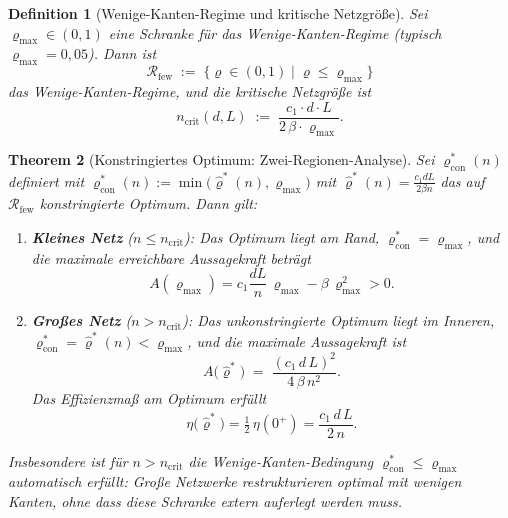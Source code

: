 \documentclass[12pt, a4paper, openany]{report}
\newtheorem{theorem}{Theorem}[chapter]
\newtheorem{definition}[theorem]{Definition}
\newcommand{\calR}{\mathcal{R}}
\begin{document}
\begin{definition}[Wenige-Kanten-Regime und kritische Netzgröße]
\label{def:few_edges}
Sei $\varrho_{\max} \in (0, 1)$ eine Schranke für das
Wenige-Kanten-Regime (typisch $\varrho_{\max} = 0{,}05$).  Dann ist
\[
  \calR_{\mathrm{few}} \;:=\; \bigl\{\varrho \in (0,1)
  \;\big|\; \varrho \leq \varrho_{\max}\bigr\}
\]
das \emph{Wenige-Kanten-Regime}, und die \emph{kritische Netzgröße} ist
\begin{equation}
  \label{eq:n_crit}
  n_{\mathrm{crit}}(d, L)
  \;:=\;
  \frac{c_1 \cdot d \cdot L}{2\,\beta \cdot \varrho_{\max}}.
\end{equation}
\end{definition}

\begin{theorem}[Konstringiertes Optimum: Zwei-Regionen-Analyse]
\label{thm:scaling}
Sei $\varrho^*_{\mathrm{con}}(n)$ definiert mit $\varrho^*_{\mathrm{con}}(n) := \min\!\bigl(\hat{\varrho}^*(n),
\varrho_{\max}\bigr)$ mit $\hat{\varrho}^*(n) = \frac{c_1 d L}{2\beta n}$
das auf $\calR_{\mathrm{few}}$ konstringierte Optimum.  Dann gilt:
\begin{enumerate}[label=(\roman*)]
  \item \textbf{Kleines Netz} ($n \leq n_{\mathrm{crit}}$):
    Das Optimum liegt am Rand, $\varrho^*_{\mathrm{con}} = \varrho_{\max}$,
    und die maximale erreichbare Aussagekraft beträgt
    \[
      A(\varrho_{\max})
      = c_1 \frac{d L}{n}\,\varrho_{\max} - \beta\,\varrho_{\max}^2
      > 0.
    \]
  \item \textbf{Großes Netz} ($n > n_{\mathrm{crit}}$):
    Das unkonstringierte Optimum liegt im Inneren,
    $\varrho^*_{\mathrm{con}} = \hat{\varrho}^*(n) < \varrho_{\max}$,
    und die maximale Aussagekraft ist
    \begin{equation}
      \label{eq:A_opt}
      A\!\bigl(\hat{\varrho}^*\bigr)
      \;=\; \frac{(c_1\,d\,L)^2}{4\,\beta\,n^2}.
    \end{equation}
    Das Effizienzmaß am Optimum erfüllt
    \begin{equation}
      \label{eq:eta_half}
      \eta\!\bigl(\hat{\varrho}^*\bigr) = \tfrac{1}{2}\,\eta(0^+)
      = \frac{c_1\,d\,L}{2\,n}.
    \end{equation}
\end{enumerate}
Insbesondere ist für $n > n_{\mathrm{crit}}$ die Wenige-Kanten-Bedingung
$\varrho^*_{\mathrm{con}} \leq \varrho_{\max}$ \emph{automatisch} erfüllt:
Große Netzwerke restrukturieren optimal mit wenigen Kanten, ohne dass diese
Schranke extern auferlegt werden muss.
\end{theorem}
\end{document}
